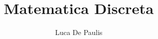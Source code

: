 \documentclass[italian,oneside,headinclude,10pt]{scrbook}
\begin{document}
\author{Luca De Paulis}
\title{Matematica Discreta}
\maketitle

\tableofcontents













% 
% 
\end{document}
